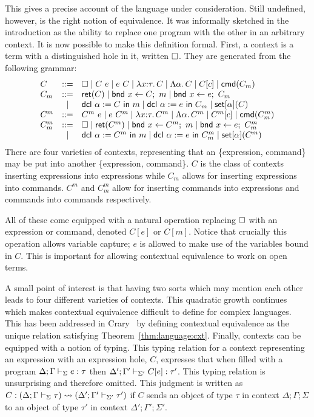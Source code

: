 This gives a precise account of the language under consideration.
Still undefined, however, is the right notion of equivalence. It was
informally sketched in the introduction as the ability to replace one
program with the other in an arbitrary context. It is now possible to
make this definition formal. First, a context is a term with a
distinguished hole in it, written $\square$. They are generated from the
following grammar:
\[
  \begin{array}{lcl}
    C &::=& \square \mid C\ e \mid e\ C \mid \lambda x {:} \tau.\, C \mid
            \Lambda \alpha.\, C \mid C[c] \mid \mathsf{cmd}(C_m)\\
    C_m &::=& \mathsf{ret}(C) \mid \mathsf{bnd}\ x \gets C;\ m \mid \mathsf{bnd}\ x \gets e;\ C_m\\
      & \mid & \mathsf{dcl}\ \alpha := C\ \mathsf{in}\ m \mid \mathsf{dcl}\ \alpha := e\ \mathsf{in}\ C_m \mid \mathsf{set}[\alpha](C)\\
    C^m &::=& C^m\ e \mid e\ C^m \mid \lambda x {:} \tau.\, C^m \mid
    \Lambda \alpha.\, C^m \mid C^m[c] \mid \mathsf{cmd}(C_m^m)\\
    C_m^m &::=& \square \mid \mathsf{ret}(C^m) \mid \mathsf{bnd}\ x \gets C^m;\ m \mid \mathsf{bnd}\ x \gets e;\ C_m^m\\
 & \mid & \mathsf{dcl}\ \alpha := C^m\ \mathsf{in}\ m \mid \mathsf{dcl}\ \alpha := e\ \mathsf{in}\ C_m^m \mid \mathsf{set}[\alpha](C^m)\\
  \end{array}
\]
There are four varieties of contexts, representing that an
\{expression, command\} may be put into another \{expression,
command\}. $C$ is the class of contexts inserting expressions into
expressions while $C_m$ allows for inserting expressions into
commands. $C^m$ and $C_m^m$ allow for inserting commands into
expressions and commands into commands respectively.

All of these come equipped with a natural operation replacing $\square$
with an expression or command, denoted $C[e]$ or $C[m]$.  Notice that
crucially this operation allows variable capture; $e$ is allowed to make use of
the variables bound in $C$. This is important for allowing contextual
equivalence to work on open terms.

A small point of interest is that having two sorts which may mention
each other leads to four different varieties of contexts. This
quadratic growth continues which makes contextual equivalence
difficult to define for complex languages. This has been addressed in
Crary~\citep{Crary:17} by defining contextual equivalence as the
unique relation satisfying Theorem~\ref{thm:language:cxt}. Finally,
contexts can be equipped with a notion of typing. This typing relation
for a context representing an expression with an expression hole, $C$,
expresses that when filled with a program
$\Delta; \Gamma \vdash_{\Sigma} e \mathrel{:} \tau$ then
$\Delta'; \Gamma' \vdash_{\Sigma'} C[e] \mathrel{:} \tau'$. This typing
relation is unsurprising and therefore omitted. This judgment is
written as
$C : (\Delta; \Gamma \vdash_{\Sigma} \tau) \rightsquigarrow (\Delta'; \Gamma' \vdash_{\Sigma'} \tau')$
if $C$ sends an object of type $\tau$ in context
$\Delta; \Gamma; \Sigma$ to an object of type $\tau'$ in context
$\Delta'; \Gamma'; \Sigma'$.

